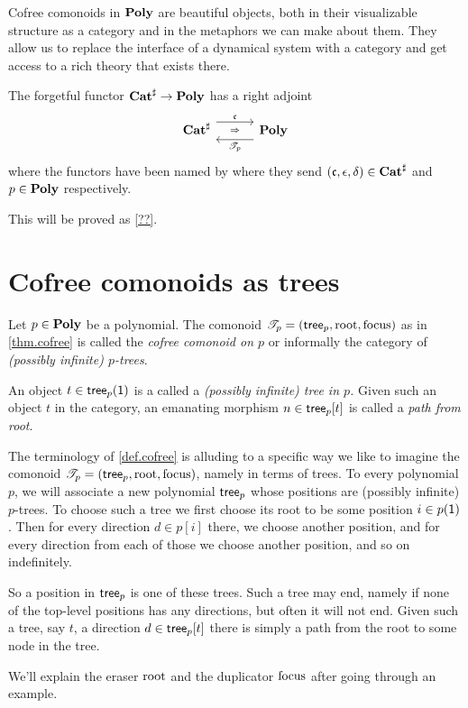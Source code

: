 \documentclass[Book-Poly]{subfiles}
\begin{document}
Cofree comonoids in $\mathbf{Poly}$ are beautiful objects, both in their visualizable structure as a category and in the metaphors we can make about them. They allow us to replace the interface of a dynamical system with a category and get access to a rich theory that exists there.

\begin{theorem}\label{thm.cofree}
The forgetful functor $\mathbf{Cat}^\sharp\to\mathbf{Poly}$ has a right adjoint
\[
  \adj{\smcat^\sharp}{\ema{c}}{\cofree{p}}{\poly}
\]
where the functors have been named by where they send $(\mathfrak{c},\epsilon,\delta)\in\mathbf{Cat}^\sharp$ and $p\in\mathbf{Poly}$ respectively.
\end{theorem}
This will be proved as \cref{??}.

\section{Cofree comonoids as trees}\label{subsec.cofree_tree}

\begin{definition}\label{def.cofree}
Let $p\in\mathbf{Poly}$ be a polynomial. The comonoid $\mathscr{T}_{p}=(\mathsf{tree}_p,\mathrm{root},\mathrm{focus})$ as in \cref{thm.cofree} is called the \emph{cofree comonoid on $p$} or informally the category of \emph{(possibly infinite) $p$-trees}.

An object $t\in \mathsf{tree}_p(\textsf{1})$ is a called a \emph{(possibly infinite) tree in $p$.} Given such an object $t$ in the category, an emanating morphism $n\in\mathsf{tree}_p[t]$ is called a \emph{path from root}.
\end{definition}

The terminology of \cref{def.cofree} is alluding to a specific way we like to imagine the comonoid $\mathscr{T}_{p}=(\mathsf{tree}_p,\mathrm{root},\mathrm{focus})$, namely in terms of trees. To every polynomial $p$, we will associate a new polynomial $\mathsf{tree}_p$ whose positions are (possibly infinite) $p$-trees. To choose such a tree we first choose its root to be some position $i\in p(\textsf{1})$. Then for every direction $d\in p[i]$ there, we choose another position, and for every direction from each of those we choose another position, and so on indefinitely.

So a position in $\mathsf{tree}_p$ is one of these trees. Such a tree may end, namely if none of the top-level positions has any directions, but often it will not end. Given such a tree, say $t$, a direction $d\in\mathsf{tree}_p[t]$ there is simply a path from the root to some node in the tree. 

We'll explain the eraser $\mathrm{root}$ and the duplicator $\mathrm{focus}$ after going through an example.
\end{document}

